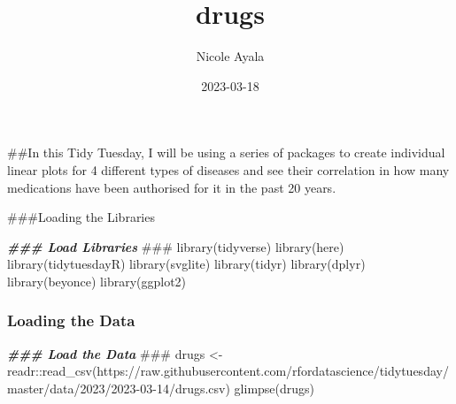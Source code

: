 \documentclass[
]{article}
\title{drugs}
\author{Nicole Ayala}
\date{2023-03-18}
\newenvironment{Shaded}{\begin{snugshade}}{\end{snugshade}}
\newcommand{\AlertTok}[1]{\textcolor[rgb]{0.94,0.16,0.16}{#1}}
\newcommand{\DocumentationTok}[1]{\textcolor[rgb]{0.56,0.35,0.01}{\textbf{\textit{#1}}}}
\newcommand{\FunctionTok}[1]{\textcolor[rgb]{0.00,0.00,0.00}{#1}}
\newcommand{\NormalTok}[1]{#1}
\newcommand{\OtherTok}[1]{\textcolor[rgb]{0.56,0.35,0.01}{#1}}
\newcommand{\SpecialCharTok}[1]{\textcolor[rgb]{0.00,0.00,0.00}{#1}}
\newcommand{\StringTok}[1]{\textcolor[rgb]{0.31,0.60,0.02}{#1}}
\begin{document}
\maketitle

\#\#In this Tidy Tuesday, I will be using a series of packages to create
individual linear plots for 4 different types of diseases and see their
correlation in how many medications have been authorised for it in the
past 20 years.

\#\#\#Loading the Libraries

\begin{Shaded}
\begin{Highlighting}[]
\DocumentationTok{\#\#\# Load Libraries }\AlertTok{\#\#\#}
\FunctionTok{library}\NormalTok{(tidyverse)}
\FunctionTok{library}\NormalTok{(here)}
\FunctionTok{library}\NormalTok{(tidytuesdayR)}
\FunctionTok{library}\NormalTok{(svglite)}
\FunctionTok{library}\NormalTok{(tidyr)}
\FunctionTok{library}\NormalTok{(dplyr)}
\FunctionTok{library}\NormalTok{(beyonce)}
\FunctionTok{library}\NormalTok{(ggplot2)}
\end{Highlighting}
\end{Shaded}

\hypertarget{loading-the-data}{%
\subsubsection{Loading the Data}\label{loading-the-data}}

\begin{Shaded}
\begin{Highlighting}[]
\DocumentationTok{\#\#\# Load the Data }\AlertTok{\#\#\#}
\NormalTok{drugs }\OtherTok{\textless{}{-}}\NormalTok{ readr}\SpecialCharTok{::}\FunctionTok{read\_csv}\NormalTok{(}\StringTok{\textquotesingle{}https://raw.githubusercontent.com/rfordatascience/tidytuesday/master/data/2023/2023{-}03{-}14/drugs.csv\textquotesingle{}}\NormalTok{)}
\FunctionTok{glimpse}\NormalTok{(drugs)}
\end{Highlighting}
\end{Shaded}
\end{document}
